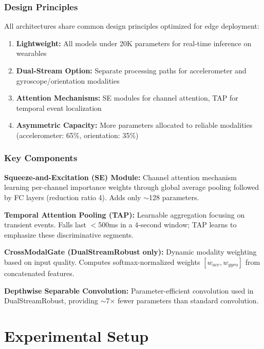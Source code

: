 \documentclass{article}
\begin{document}
\subsubsection{Design Principles}

All architectures share common design principles optimized for edge deployment:

\begin{enumerate}
    \item \textbf{Lightweight:} All models under 20K parameters for real-time inference on wearables
    \item \textbf{Dual-Stream Option:} Separate processing paths for accelerometer and gyroscope/orientation modalities
    \item \textbf{Attention Mechanisms:} SE modules for channel attention, TAP for temporal event localization
    \item \textbf{Asymmetric Capacity:} More parameters allocated to reliable modalities (accelerometer: 65\%, orientation: 35\%)
\end{enumerate}

\subsubsection{Key Components}

\textbf{Squeeze-and-Excitation (SE) Module:} Channel attention mechanism learning per-channel importance weights through global average pooling followed by FC layers (reduction ratio 4). Adds only $\sim$128 parameters.

\textbf{Temporal Attention Pooling (TAP):} Learnable aggregation focusing on transient events. Falls last $<$500ms in a 4-second window; TAP learns to emphasize these discriminative segments.

\textbf{CrossModalGate (DualStreamRobust only):} Dynamic modality weighting based on input quality. Computes softmax-normalized weights $[w_{acc}, w_{gyro}]$ from concatenated features.

\textbf{Depthwise Separable Convolution:} Parameter-efficient convolution used in DualStreamRobust, providing $\sim$7$\times$ fewer parameters than standard convolution.

\section{Experimental Setup}
\end{document}
